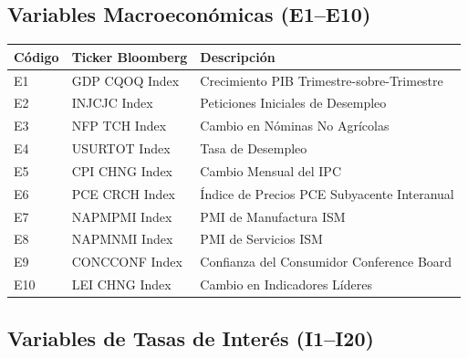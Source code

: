 \documentclass[11pt,a4paper]{article}
\begin{document}
\subsection{Variables Macroeconómicas (E1--E10)}

\small
\begin{longtable}{lp{3.5cm}p{7.5cm}}
\toprule
\textbf{Código} & \textbf{Ticker Bloomberg} & \textbf{Descripción} \\
\midrule
\endhead
E1 & GDP CQOQ Index & Crecimiento PIB Trimestre-sobre-Trimestre \\
E2 & INJCJC Index & Peticiones Iniciales de Desempleo \\
E3 & NFP TCH Index & Cambio en Nóminas No Agrícolas \\
E4 & USURTOT Index & Tasa de Desempleo \\
E5 & CPI CHNG Index & Cambio Mensual del IPC \\
E6 & PCE CRCH Index & Índice de Precios PCE Subyacente Interanual \\
E7 & NAPMPMI Index & PMI de Manufactura ISM \\
E8 & NAPMNMI Index & PMI de Servicios ISM \\
E9 & CONCCONF Index & Confianza del Consumidor Conference Board \\
E10 & LEI CHNG Index & Cambio en Indicadores Líderes \\
\bottomrule
\end{longtable}
\normalsize

\subsection{Variables de Tasas de Interés (I1--I20)}
\end{document}
